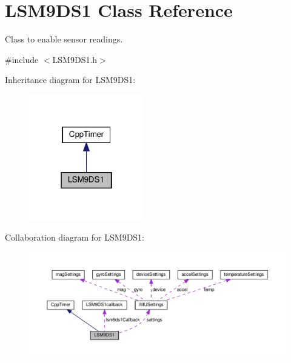 \hypertarget{classLSM9DS1}{}\section{L\+S\+M9\+D\+S1 Class Reference}
\label{classLSM9DS1}


Class to enable sensor readings.  




{\ttfamily \#include $<$L\+S\+M9\+D\+S1.\+h$>$}



Inheritance diagram for L\+S\+M9\+D\+S1\+:
\nopagebreak
\begin{figure}[H]
\begin{center}
\leavevmode
\includegraphics[width=142pt]{classLSM9DS1__inherit__graph}
\end{center}
\end{figure}


Collaboration diagram for L\+S\+M9\+D\+S1\+:
\nopagebreak
\begin{figure}[H]
\begin{center}
\leavevmode
\includegraphics[width=350pt]{classLSM9DS1__coll__graph}
\end{center}
\end{figure}
